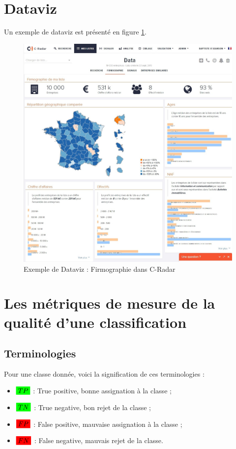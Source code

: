 \section{Dataviz}
\label{annexe:firmo}
    Un exemple de dataviz est présenté en figure \ref{fig:firmo}.
    \begin{figure}[h!]
        \centering
        \includegraphics[width=\textwidth]{images/firmo.jpg}
        \caption{Exemple de Dataviz : Firmographie dans C-Radar}
        \label{fig:firmo}
    \end{figure}

\section{Les métriques de mesure de la qualité d'une classification}
    \subsection{Terminologies}
        Pour une classe donnée, voici la signification de ces terminologies :
        \begin{itemize}
            \item $\highlight[green]{TP}$ : True positive, bonne assignation à la classe ;
            \item $\highlight[green]{TN}$ : True negative, bon rejet de la classe ;
            \item $\highlight[red]{FP}$ : False positive, mauvaise assignation à la classe ;
            \item $\highlight[red]{FN}$ : False negative, mauvais rejet de la classe.
        \end{itemize}

